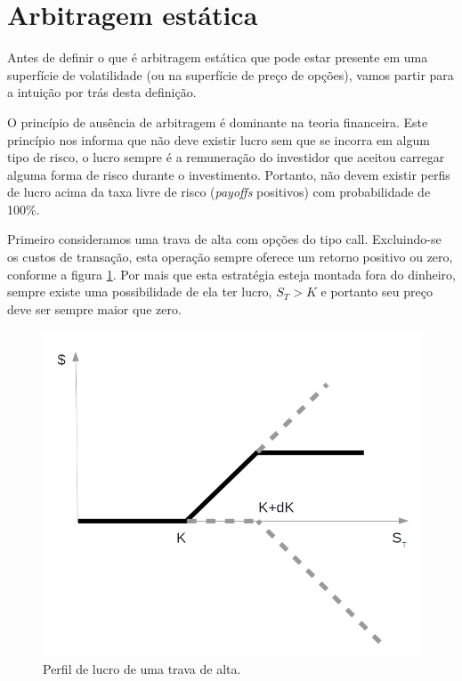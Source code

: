 \documentclass[]{book}
\begin{document}
\section{Arbitragem estática}\label{arbestatica}

Antes de definir o que é arbitragem estática que pode estar presente em
uma superfície de volatilidade (ou na superfície de preço de opções),
vamos partir para a intuição por trás desta definição.

O princípio de ausência de arbitragem é dominante na teoria financeira.
Este princípio nos informa que não deve existir lucro sem que se incorra
em algum tipo de risco, o lucro sempre é a remuneração do investidor que
aceitou carregar alguma forma de risco durante o investimento. Portanto,
não devem existir perfis de lucro acima da taxa livre de risco
(\emph{payoffs} positivos) com probabilidade de 100\%.

Primeiro consideramos uma trava de alta com opções do tipo call.
Excluindo-se os custos de transação, esta operação sempre oferece um
retorno positivo ou zero, conforme a figura \ref{fig:trava-alta}. Por
mais que esta estratégia esteja montada fora do dinheiro, sempre existe
uma possibilidade de ela ter lucro, \(S_T>K\) e portanto seu preço deve
ser sempre maior que zero.

\begin{figure}
\centering
\includegraphics{./images/trava_alta.png}
\caption{\label{fig:trava-alta}Perfil de lucro de uma trava de alta.}
\end{figure}
\end{document}
